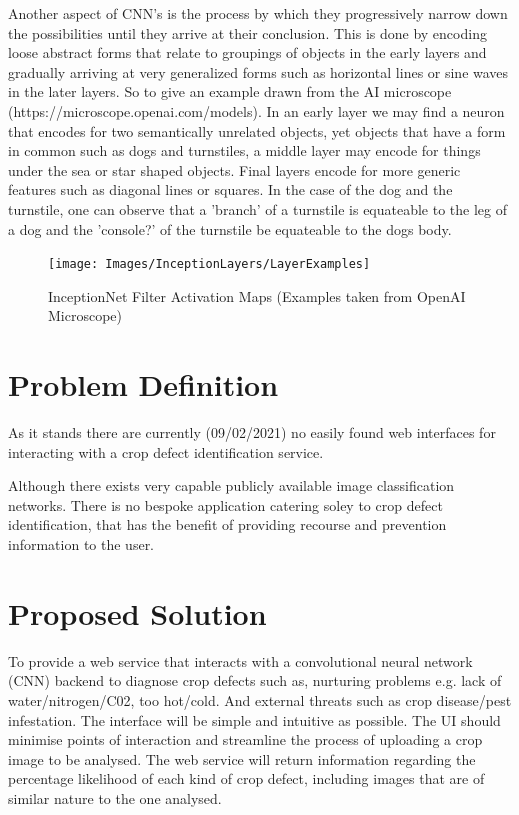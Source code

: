     Another aspect of CNN's is the process by which they progressively narrow down the possibilities until they arrive at their conclusion. This is done by encoding loose abstract forms that relate to groupings of objects in the early layers and gradually arriving at very generalized forms such as horizontal lines or sine waves in the later layers. So to give an example drawn from the AI microscope (https://microscope.openai.com/models). In an early layer  we may find a neuron that encodes for two semantically unrelated objects, yet objects that have a form in common such as dogs and turnstiles, a middle layer may encode for things under the sea or star shaped objects. Final layers encode for more generic features such as diagonal lines or squares. In the case of the dog and the turnstile, one can observe that a 'branch' of a turnstile is equateable to the leg of a dog and the 'console?' of the turnstile be equateable to the dogs body.

    \begin{landscape}
      \begin{figure}[H]
        \begin{center}
          \texttt{[image: Images/InceptionLayers/LayerExamples]}
          \caption{InceptionNet Filter Activation Maps (Examples taken from OpenAI Microscope)}
          \label{fig:inceptionNet_filter_activation}
        \end{center}
      \end{figure}
    \end{landscape}
    \par

  \newpage

\section{Problem Definition}
  As it stands there are currently (09/02/2021) no easily found  web interfaces for interacting with a crop defect identification service.
  \par
  Although there exists very capable publicly available image classification networks. \cite{Yandex} There is no bespoke application catering soley to crop defect identification, that has the benefit of providing recourse and prevention information to the user.

\section{Proposed Solution}
  To provide a web service that interacts with a convolutional neural network (CNN) backend to diagnose crop defects such as, nurturing problems e.g. lack of water/nitrogen/C02, too hot/cold. And external threats such as crop disease/pest infestation. The interface will be simple and intuitive as possible. The UI should minimise points of interaction and streamline the process of uploading a crop image to be analysed.
	The web service will return information regarding the percentage likelihood of each kind of crop defect, including images that are of similar nature to the one analysed.

